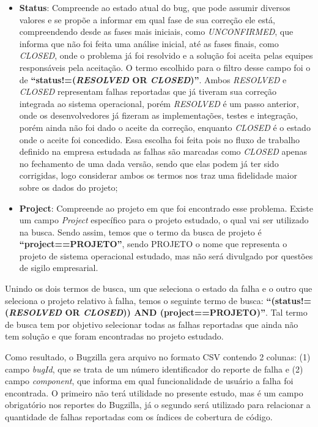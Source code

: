 \documentclass[11.5pt]{article}
\begin{document}
\begin{itemize}
    \item \textbf{Status}: Compreende ao estado atual do bug, que pode assumir diversos valores e
          se propõe a informar em qual fase de sua correção ele está, compreendendo desde as fases
          mais iniciais, como \textit{UNCONFIRMED}, que informa que não foi feita uma análise
          inicial, até as fases finais, como \textit{CLOSED}, onde o problema já foi resolvido e
          a solução foi aceita pelas equipes responsáveis pela aceitação.
          O termo escolhido para o filtro desse campo foi o de
          \textbf{``status!=(\textit{RESOLVED} OR \textit{CLOSED})''}.
          Ambos \textit{RESOLVED} e \textit{CLOSED} representam falhas reportadas que já tiveram sua
          correção integrada ao sistema operacional, porém \textit{RESOLVED} é um passo anterior,
          onde os desenvolvedores já fizeram as implementações, testes e integração, porém ainda
          não foi dado o aceite da correção, enquanto \textit{CLOSED} é o estado onde o aceite foi
          concedido.
          Essa escolha foi feita pois no fluxo de trabalho definido na empresa estudada as falhas
          são marcadas como \textit{CLOSED} apenas no fechamento de uma dada versão, sendo que elas
          podem já ter sido corrigidas, logo considerar ambos os termos nos traz uma fidelidade
          maior sobre os dados do projeto;

    \item \textbf{Project}: Compreende ao projeto em que foi encontrado esse problema. Existe um
          campo \textit{Project} específico para o projeto estudado, o qual vai ser utilizado na
          busca. Sendo assim, temos que o termo da busca de projeto é
          \textbf{``project==PROJETO''}, sendo PROJETO o nome que representa o projeto de sistema
          operacional estudado, mas não será divulgado por questões de sigilo empresarial.
\end{itemize}

Unindo os dois termos de busca, um que seleciona o estado da falha e o outro que seleciona o projeto
relativo à falha, temos o seguinte termo de busca:
\textbf{``(status!=(\textit{RESOLVED} OR \textit{CLOSED})) AND (project==PROJETO)''}.
Tal termo de busca tem por objetivo selecionar todas as falhas reportadas que ainda não tem solução
e que foram encontradas no projeto estudado.

Como resultado, o Bugzilla gera arquivo no formato CSV contendo 2 colunas:
(1) campo \textit{bugId}, que se trata de um número identificador do reporte de falha e
(2) campo \textit{component}, que informa em qual funcionalidade de usuário a falha foi encontrada.
O primeiro não terá utilidade no presente estudo, mas é um campo obrigatório nos reportes do
Bugzilla, já o segundo será utilizado para relacionar a quantidade de falhas reportadas com os
índices de cobertura de código.
\end{document}

